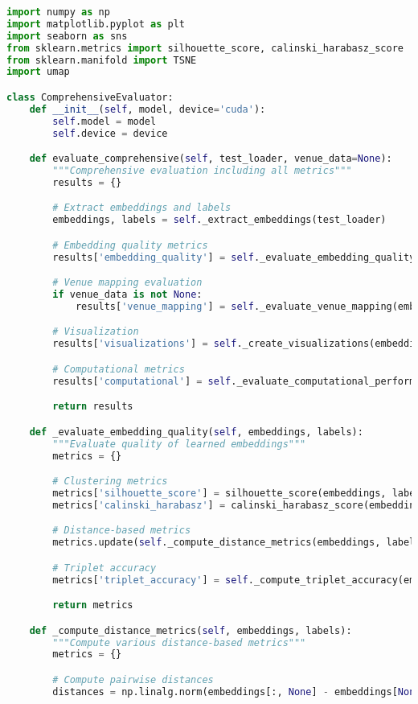 \begin{lstlisting}[language=Python, caption=Comprehensive Evaluation Implementation]
import numpy as np
import matplotlib.pyplot as plt
import seaborn as sns
from sklearn.metrics import silhouette_score, calinski_harabasz_score
from sklearn.manifold import TSNE
import umap

class ComprehensiveEvaluator:
    def __init__(self, model, device='cuda'):
        self.model = model
        self.device = device

    def evaluate_comprehensive(self, test_loader, venue_data=None):
        """Comprehensive evaluation including all metrics"""
        results = {}

        # Extract embeddings and labels
        embeddings, labels = self._extract_embeddings(test_loader)

        # Embedding quality metrics
        results['embedding_quality'] = self._evaluate_embedding_quality(embeddings, labels)

        # Venue mapping evaluation
        if venue_data is not None:
            results['venue_mapping'] = self._evaluate_venue_mapping(embeddings, venue_data)

        # Visualization
        results['visualizations'] = self._create_visualizations(embeddings, labels)

        # Computational metrics
        results['computational'] = self._evaluate_computational_performance(test_loader)

        return results

    def _evaluate_embedding_quality(self, embeddings, labels):
        """Evaluate quality of learned embeddings"""
        metrics = {}

        # Clustering metrics
        metrics['silhouette_score'] = silhouette_score(embeddings, labels)
        metrics['calinski_harabasz'] = calinski_harabasz_score(embeddings, labels)

        # Distance-based metrics
        metrics.update(self._compute_distance_metrics(embeddings, labels))

        # Triplet accuracy
        metrics['triplet_accuracy'] = self._compute_triplet_accuracy(embeddings, labels)

        return metrics

    def _compute_distance_metrics(self, embeddings, labels):
        """Compute various distance-based metrics"""
        metrics = {}

        # Compute pairwise distances
        distances = np.linalg.norm(embeddings[:, None] - embeddings[None, :], axis=2)


\end{lstlisting}
